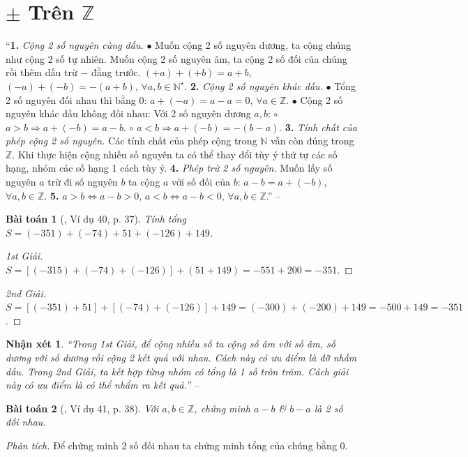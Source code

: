 \documentclass{article}
\numberwithin{equation}{section}
\newtheorem{baitoan}{Bài toán}
\newtheorem{nhanxet}{Nhận xét}[section]
\begin{document}
\section{$\pm$ Trên $\mathbb{Z}$}
``\textbf{1.} \textit{Cộng 2 số nguyên cùng dấu.} $\bullet$ Muốn cộng 2 số nguyên dương, ta cộng chúng như cộng 2 số tự nhiên. Muốn cộng 2 số nguyên âm, ta cộng 2 số đối của chúng rồi thêm dấu trừ $-$ đằng trước. $(+a) + (+b) = a + b$, $(-a) + (-b) = -(a + b)$, $\forall a,b\in\mathbb{N}^\star$. \textbf{2.} \textit{Cộng 2 số nguyên khác dấu.} $\bullet$ Tổng 2 số nguyên đối nhau thì bằng $0$: $a + (-a) = a - a = 0$, $\forall a\in\mathbb{Z}$. $\bullet$ Cộng 2 số nguyên khác dấu không đối nhau: Với 2 số nguyên dương $a,b$: $\circ$ $a > b\Rightarrow a + (-b) = a - b$. $\circ$ $a < b\Rightarrow a + (-b) = -(b - a)$. \textbf{3.} \textit{Tính chất của phép cộng 2 số nguyên.} Các tính chất của phép cộng trong $\mathbb{N}$ vẫn còn đúng trong $\mathbb{Z}$. Khi thực hiện cộng nhiều số nguyên ta có thể thay đổi tùy ý thứ tự các số hạng, nhóm các số hạng 1 cách tùy ý. \textbf{4.} \textit{Phép trừ 2 số nguyên.} Muốn lấy số nguyên $a$ trừ đi số nguyên $b$ ta cộng $a$ với số đối của $b$: $a - b = a + (-b)$, $\forall a,b\in\mathbb{Z}$. \textbf{5.} $a > b\Leftrightarrow a - b > 0$, $a < b\Leftrightarrow a - b < 0$, $\forall a,b\in\mathbb{Z}$.'' -- \cite[Chap. 2, \S2, p. 37]{Tuyen_Toan_6}

\begin{baitoan}[\cite{Tuyen_Toan_6}, Ví dụ 40, p. 37]
	Tính tổng $S = (-351) + (-74) + 51 + (-126) + 149$.
\end{baitoan}

\begin{proof}[1st Giải]
	$S = [(-315) + (-74) + (-126)] + (51 + 149) = -551 + 200 = -351$.
\end{proof}

\begin{proof}[2nd Giải]
	$S = [(-351) + 51] + [(-74) + (-126)] + 149 = (-300) + (-200) + 149 = -500 + 149 = -351$.
\end{proof}

\begin{nhanxet}
	``Trong 1st Giải, để cộng nhiều số ta cộng số âm với số âm, số dương với số dương rồi cộng 2 kết quả với nhau. Cách này có ưu điểm là đỡ nhầm dấu. Trong 2nd Giải, ta kết hợp từng nhóm có tổng là 1 số tròn trăm. Cách giải này có ưu điểm là có thể nhẩm ra kết quả.'' -- \cite[p. 37]{Tuyen_Toan_6}
\end{nhanxet}

\begin{baitoan}[\cite{Tuyen_Toan_6}, Ví dụ 41, p. 38]
	Với $a,b\in\mathbb{Z}$, chứng minh $a - b$ \& $b - a$ là 2 số đối nhau.
\end{baitoan}
\noindent\textit{Phân tích.} Để chứng minh 2 số đối nhau ta chứng minh tổng của chúng bằng $0$.
 
\end{document}
